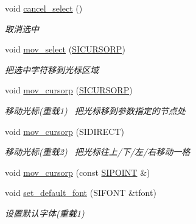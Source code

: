 \begin{DoxyCompactItemize}
void \hyperlink{class_s_i_t_e_x_t_a3a942ca324f4c37a4d747ba7a91a293b}{cancel\+\_\+select} ()
\begin{DoxyCompactList}\small\item\em 取消选中~\newline
\end{DoxyCompactList}\item 
\mbox{\label{class_s_i_t_e_x_t_abb0fb0438be292cc363813dece5b6258}} 
void \hyperlink{class_s_i_t_e_x_t_abb0fb0438be292cc363813dece5b6258}{mov\+\_\+select} (\hyperlink{class_s_i_c_h_a_r_n_o_d_e}{S\+I\+C\+U\+R\+S\+O\+RP})
\begin{DoxyCompactList}\small\item\em 把选中字符移到光标区域 \end{DoxyCompactList}\item 
void \hyperlink{class_s_i_t_e_x_t_a79c57242ea31d6792f319aaf5ac8d8f0}{mov\+\_\+cursorp} (\hyperlink{class_s_i_c_h_a_r_n_o_d_e}{S\+I\+C\+U\+R\+S\+O\+RP})
\begin{DoxyCompactList}\small\item\em 移动光标(重载1)~\newline
把光标移到参数指定的节点处 \end{DoxyCompactList}\item 
void \hyperlink{class_s_i_t_e_x_t_afdf96b3841922ef6436666b9e7bc884d}{mov\+\_\+cursorp} (S\+I\+D\+I\+R\+E\+CT)
\begin{DoxyCompactList}\small\item\em 移动光标(重载2)~\newline
把光标往上/下/左/右移动一格 \end{DoxyCompactList}\item 
void \hyperlink{class_s_i_t_e_x_t_a4542e94a4f3d3e4d47983bf051dc7ec4}{mov\+\_\+cursorp} (const \hyperlink{struct_s_i_p_o_i_n_t}{S\+I\+P\+O\+I\+NT} \&)
\item 
\mbox{\label{class_s_i_t_e_x_t_a3e04be8b17cd6702fc52158f9b3b276b}} 
void \hyperlink{class_s_i_t_e_x_t_a3e04be8b17cd6702fc52158f9b3b276b}{set\+\_\+default\+\_\+font} (S\+I\+F\+O\+NT \&tfont)
\begin{DoxyCompactList}\small\item\em 设置默认字体(重载1) \end{DoxyCompactList}\item 
\mbox{\label{class_s_i_t_e_x_t_a8fcd320042283b60f57630bdb8fd5bc8}} 

\end{DoxyCompactItemize}
